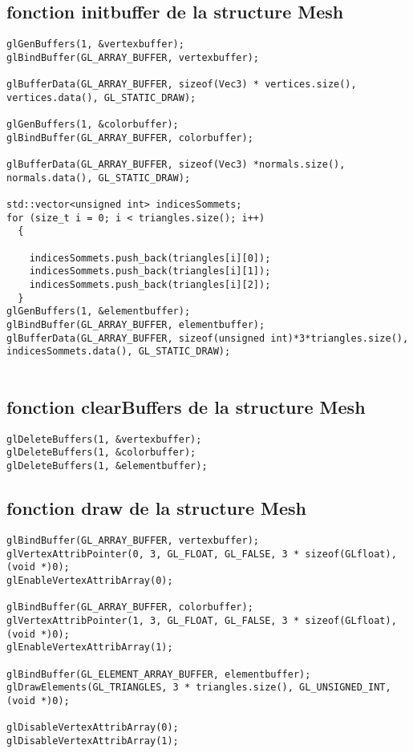 \documentclass{article}
\begin{document}
\subsection{fonction initbuffer de la structure Mesh}
\begin{lstlisting}
glGenBuffers(1, &vertexbuffer);
glBindBuffer(GL_ARRAY_BUFFER, vertexbuffer);

glBufferData(GL_ARRAY_BUFFER, sizeof(Vec3) * vertices.size(), vertices.data(), GL_STATIC_DRAW);

glGenBuffers(1, &colorbuffer);
glBindBuffer(GL_ARRAY_BUFFER, colorbuffer);

glBufferData(GL_ARRAY_BUFFER, sizeof(Vec3) *normals.size(), normals.data(), GL_STATIC_DRAW);

std::vector<unsigned int> indicesSommets;
for (size_t i = 0; i < triangles.size(); i++)
  {

    indicesSommets.push_back(triangles[i][0]);
    indicesSommets.push_back(triangles[i][1]);
    indicesSommets.push_back(triangles[i][2]);
  }
glGenBuffers(1, &elementbuffer);
glBindBuffer(GL_ARRAY_BUFFER, elementbuffer);
glBufferData(GL_ARRAY_BUFFER, sizeof(unsigned int)*3*triangles.size(), indicesSommets.data(), GL_STATIC_DRAW);
    
\end{lstlisting}

\subsection{fonction clearBuffers de la structure Mesh}

\begin{lstlisting}
glDeleteBuffers(1, &vertexbuffer);
glDeleteBuffers(1, &colorbuffer);
glDeleteBuffers(1, &elementbuffer);
\end{lstlisting}


\subsection{fonction draw de la structure Mesh}
\begin{lstlisting}
glBindBuffer(GL_ARRAY_BUFFER, vertexbuffer);
glVertexAttribPointer(0, 3, GL_FLOAT, GL_FALSE, 3 * sizeof(GLfloat), (void *)0);
glEnableVertexAttribArray(0);

glBindBuffer(GL_ARRAY_BUFFER, colorbuffer);
glVertexAttribPointer(1, 3, GL_FLOAT, GL_FALSE, 3 * sizeof(GLfloat), (void *)0);
glEnableVertexAttribArray(1);

glBindBuffer(GL_ELEMENT_ARRAY_BUFFER, elementbuffer);
glDrawElements(GL_TRIANGLES, 3 * triangles.size(), GL_UNSIGNED_INT, (void *)0);

glDisableVertexAttribArray(0);
glDisableVertexAttribArray(1);
\end{lstlisting}
\end{document}
